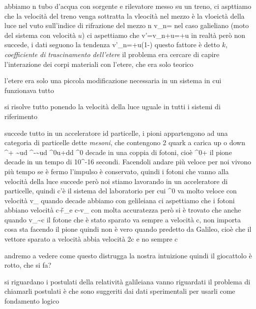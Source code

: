 \begin{experiment}
	abbiamo n tubo d'acqua con sorgente e rilevatore messo su un treno, ci aspttiamo che la velocità del treno venga sottratta
	la vleocità nel mezzo è la vloeictà della luce nel vuto sull'indice di rifrazione del mezzo n
		v_n=
	nel caso galieliano (moto del sistema con velocità $u$) ci aspettiamo che 
		v'=v_n+u=+u
	in realtà però non succede, i dati seguono la tendenza
		v'_n=+u\left(1-\right)
	questo fattore è detto $k$, \textit{coefficiente di trascinamento dell'etere}
	il problema era cercare di capire l'interazione dei corpi materiali con l'etere, che era solo teorico
	
\end{experiment}

l'etere era solo una piccola modificazione necessaria in un sistema in cui funzionava tutto

si risolve tutto ponendo la velocità della luce uguale in tutti i sistemi di riferimento
\begin{experiment}
	succede tutto in un acceleratore id particelle, i pioni appartengono ad una categoria di particelle dette \textit{mesoni}, che contengono 2 quark a carica up o down
		\pi^+ \sim u\vba d
		\pi^-\sim\vba ud
		\pi^0\simu\vba u+d\vba d
	\pi^0 decade in una coppia di fotoni, cioè
		\pi^0\rightarrow\gamma+\gamma
	il pione decade in un tempo di 10^{-16} secondi. Facendoli andare più veloce per noi vivono più tempo
	se è fermo l'impulso è conservato, quindi i fotoni che vanno alla velocità della luce succede
	però noi stiamo lavorando in un acceleratore di particelle, quindi c'è il sistema del laboratorio per cui \pi^0 va molto veloce con velocità v_\pi
	quando decade abbiamo
	con gelileiana ci aspettiamo che i fotoni abbiano velocità c+\v_\pi e c-v_\pi
	con molta accuratezza però si è trovato che anche quando v_\pi\sim c il fotone che è stato sparato va sempre a velocità c, non importa cosa sta facendo il pione	
	quindi non è vero quando predetto da Galileo, cioè che il vettore sparato a velocità abbia velocità 2c e no sempre c
	
\end{experiment}

andremo a vedere come questo distrugga la nostra intuizione
quindi il giocattolo è rotto, che si fa?

si riguardano i postulati della relatività galileiana vanno riguardati
il problema di chiamarli postulati è che sono suggeriti dai dati sperimentali per usarli come fondamento logico

